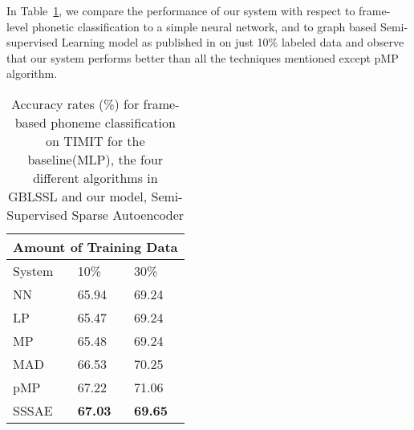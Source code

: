 In Table~\ref{table:timitssl}, we compare the performance of our system with respect to frame-level phonetic classification to a simple neural network, and to graph based Semi-supervised Learning model as published in \cite{liu-2013} on just 10\% labeled data and observe that our system performs better than all the techniques mentioned except pMP algorithm. 
\begin{table}[h!]
\centering
  \begin{tabular}{ |p{3cm}|p{3cm}|p{3cm}|  }
    \hline
    \multicolumn{3}{|c|}{Amount of Training Data} \\
    \hline
    System & 10\% & 30\%  \\ [1ex]
    \hline\hline
  NN &  65.94 &  69.24 \\
    \hline
    LP & 65.47 & 69.24 \\
    MP & 65.48 & 69.24 \\
    MAD & 66.53 &  70.25 \\
    pMP & 67.22 & 71.06 \\
    \hline\hline
  SSSAE & \textbf{67.03} & \textbf{69.65} \\
    \hline
    \hline
  \end{tabular}
    \caption{Accuracy rates (\%) for frame-based phoneme classification on TIMIT for the baseline(MLP), the four different algorithms in GBLSSL and our model, Semi-Supervised Sparse Autoencoder}
    \label{table:timitssl}
\end{table}



